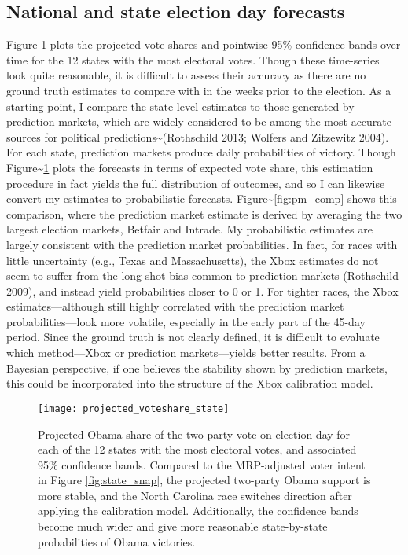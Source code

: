 \subsection{National and state election day
forecasts}\label{national-and-state-election-day-forecasts}

Figure \ref{fig:proj_state} plots the projected vote shares and
pointwise 95\% confidence bands over time for the 12 states with the
most electoral votes. Though these time-series look quite reasonable, it
is difficult to assess their accuracy as there are no ground truth
estimates to compare with in the weeks prior to the election. As a
starting point, I compare the state-level estimates to those generated
by prediction markets, which are widely considered to be among the most
accurate sources for political predictions\textasciitilde{}(Rothschild
2013; Wolfers and Zitzewitz 2004). For each state, prediction markets
produce daily probabilities of victory. Though
Figure\textasciitilde{}\ref{fig:proj_state} plots the forecasts in terms
of expected vote share, this estimation procedure in fact yields the
full distribution of outcomes, and so I can likewise convert my
estimates to probabilistic forecasts.
Figure\textasciitilde{}\ref{fig:pm_comp} shows this comparison, where
the prediction market estimate is derived by averaging the two largest
election markets, Betfair and Intrade. My probabilistic estimates are
largely consistent with the prediction market probabilities. In fact,
for races with little uncertainty (e.g., Texas and Massachusetts), the
Xbox estimates do not seem to suffer from the long-shot bias common to
prediction markets (Rothschild 2009), and instead yield probabilities
closer to 0 or 1. For tighter races, the Xbox estimates---although still
highly correlated with the prediction market probabilities---look more
volatile, especially in the early part of the 45-day period. Since the
ground truth is not clearly defined, it is difficult to evaluate which
method---Xbox or prediction markets---yields better results. From a
Bayesian perspective, if one believes the stability shown by prediction
markets, this could be incorporated into the structure of the Xbox
calibration model.

\begin{figure}[p!]
  \centering
  \texttt{[image: projected\_voteshare\_state]}
  \caption{Projected Obama share of the two-party vote on election day
    for each of the 12 states
    with the most electoral votes, and associated 95\% confidence
    bands. Compared to the MRP-adjusted voter intent in Figure
    \ref{fig:state_snap}, the projected two-party Obama support is more stable, and the North Carolina race switches direction after applying the
    calibration model. Additionally, the confidence bands become much wider and
    give more reasonable state-by-state probabilities of Obama victories.}
  \label{fig:proj_state}
\end{figure}

